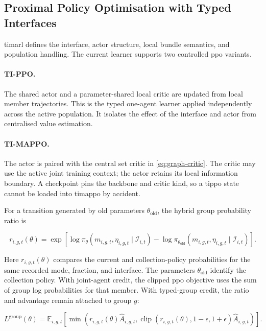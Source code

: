\subsection{Proximal Policy Optimisation with Typed Interfaces}
\label{sec:timarl-backbones}

\gls{timarl} defines the interface, actor structure, local bundle semantics, and population handling. The current learner supports two controlled \gls{ppo} variants.

\paragraph{TI-PPO.}
The shared actor and a parameter-shared local critic are updated from local member trajectories. This is the typed one-agent learner applied independently across the active population. It isolates the effect of the interface and actor from centralised value estimation.

\paragraph{TI-MAPPO.}
The actor is paired with the central set critic in \cref{eq:graph-critic}. The critic may use the active joint training context; the actor retains its local information boundary. A checkpoint pins the backbone and critic kind, so a \gls{tippo} state cannot be loaded into \gls{timappo} by accident.

For a transition generated by old parameters $\theta_{\mathrm{old}}$, the hybrid group probability ratio is

\begin{equation}
r_{i,g,t}(\theta)
=
\exp\left[
\log\pi_{\theta}(m_{i,g,t},\eta_{i,g,t}\mid\mathcal{I}_{i,t})
-
\log\pi_{\theta_{\mathrm{old}}}(m_{i,g,t},\eta_{i,g,t}\mid\mathcal{I}_{i,t})
\right].
\label{eq:timarl-ratio}
\end{equation}

Here $r_{i,g,t}(\theta)$ compares the current and collection-policy probabilities for the same recorded mode, fraction, and interface. The parameters $\theta_{\mathrm{old}}$ identify the collection policy. With joint-agent credit, the clipped \gls{ppo} objective uses the sum of group log probabilities for that member. With typed-group credit, the ratio and advantage remain attached to group $g$:

\begin{equation}
L^{\mathrm{group}}(\theta)
=
\mathbb{E}_{i,g,t}
\left[
\min\left(
r_{i,g,t}(\theta)\hat{A}_{i,g,t},
\operatorname{clip}(r_{i,g,t}(\theta),1-\epsilon,1+\epsilon)
\hat{A}_{i,g,t}
\right)
\right].
\label{eq:timarl-group-ppo}
\end{equation}

